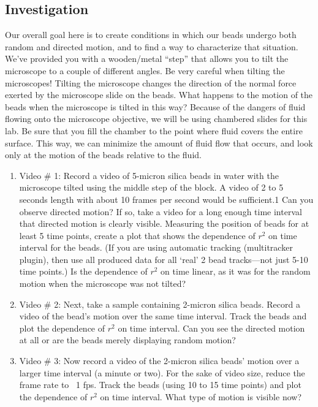\subsection*{Investigation}
Our overall goal here is to create conditions in which our beads undergo both random and directed motion, and to find a way to characterize that situation. 
We’ve provided you with a wooden/metal ``step'' that allows you to tilt the microscope to a couple of different angles. 
Be very careful when tilting the microscopes! 
Tilting the microscope changes the direction of the normal force exerted by the microscope slide on the beads. 
What happens to the motion of the beads when the microscope is tilted in this way? 
Because of the dangers of fluid flowing onto the microscope objective, we will be using chambered slides for this lab. 
Be sure that you fill the chamber to the point where fluid covers the entire surface. 
This way, we can minimize the amount of fluid flow that occurs, and look only at the motion of the beads relative to the fluid.
\begin{enumerate}
\item Video \# 1: Record a video of 5-micron silica beads in water with the microscope tilted using the middle step of the block. A video of 2 to 5 seconds length with about 10 frames per second would be sufficient.1 Can you observe directed motion? If so, take a video for a long enough time interval that directed motion is clearly visible. Measuring the position of beads for at least 5 time points, create a plot that shows the dependence of $r^{2}$ on time interval for the beads. (If you are using automatic tracking (multitracker plugin), then use all produced data for all `real' 2 bead tracks—not just 5-10 time points.) Is the dependence of $r^{2}$ on time linear, as it was for the random motion when the microscope was not tilted?
\item Video \# 2: Next, take a sample containing 2-micron silica beads. Record a video of the bead’s motion over the same time interval. Track the beads and plot the dependence of $r^{2}$ on time interval. Can you see the directed motion at all or are the beads merely displaying random motion?
\item Video \# 3: Now record a video of the 2-micron silica beads’ motion over a larger time interval (a minute or two). For the sake of video size, reduce the frame rate to ~1 fps. Track the beads (using 10 to 15 time points) and plot the dependence of $r^{2}$ on time interval. What type of motion is visible now?
\end{enumerate}
